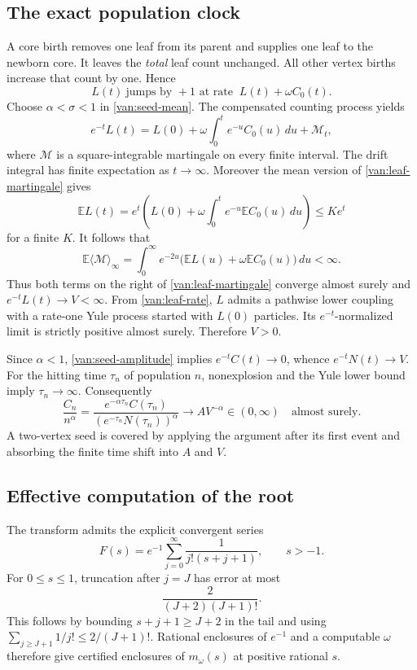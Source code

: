 \subsection{The exact population clock}

A core birth removes one leaf from its parent and supplies one leaf
to the newborn core.  It leaves the \emph{total} leaf count unchanged.
All other vertex births increase that count by one.  Hence
\begin{equation}
 L(t)\ \text{jumps by }+1\text{ at rate }\ L(t)+\omega C_0(t).
 \label{van:leaf-rate}
\end{equation}
Choose $\alpha<\sigma<1$ in \eqref{van:seed-mean}.
The compensated counting process yields
\begin{equation}
 e^{-t}L(t)=L(0)+\omega\int_0^t e^{-u}C_0(u)\,du+\mathcal M_t,
 \label{van:leaf-martingale}
\end{equation}
where $\mathcal M$ is a square-integrable martingale on every finite
interval.  The drift integral has finite expectation as $t\to\infty$.
Moreover the mean version of \eqref{van:leaf-martingale} gives
\[
 \mathbb E L(t)
 =e^t\left(L(0)+\omega\int_0^t e^{-u}\mathbb E C_0(u)\,du\right)
 \le K e^t
\]
for a finite $K$.  It follows that
\[
 \mathbb E\langle\mathcal M\rangle_\infty
 =\int_0^\infty e^{-2u}
       \bigl(\mathbb E L(u)+\omega\mathbb E C_0(u)\bigr)\,du<\infty.
\]
Thus both terms on the right of \eqref{van:leaf-martingale} converge
almost surely and $e^{-t}L(t)\to V<\infty$.
From \eqref{van:leaf-rate}, $L$ admits a pathwise lower coupling
with a rate-one Yule process started with $L(0)$ particles.
Its $e^{-t}$-normalized limit is strictly positive almost surely.
Therefore $V>0$.

Since $\alpha<1$, \eqref{van:seed-amplitude} implies
$e^{-t}C(t)\to0$, whence $e^{-t}N(t)\to V$.
For the hitting time $\tau_n$ of population $n$, nonexplosion and
the Yule lower bound imply $\tau_n\to\infty$.
Consequently
\[
 \frac{C_n}{n^\alpha}
 =\frac{e^{-\alpha\tau_n}C(\tau_n)}
        {(e^{-\tau_n}N(\tau_n))^\alpha}
 \longrightarrow A V^{-\alpha}\in(0,\infty)
 \quad\text{almost surely}.
\]
A two-vertex seed is covered by applying the argument after its
first event and absorbing the finite time shift into $A$ and $V$.

\subsection{Effective computation of the root}

The transform admits the explicit convergent series
\begin{equation}
 F(s)=e^{-1}\sum_{j=0}^\infty\frac1{j!(s+j+1)},
 \qquad s>-1.
 \label{van:series}
\end{equation}
For $0\le s\le1$, truncation after $j=J$ has error at most
\[
 \frac{2}{(J+2)(J+1)!}.
\]
This follows by bounding $s+j+1\ge J+2$ in the tail and using
$\sum_{j\ge J+1}1/j!\le2/(J+1)!$.
Rational enclosures of $e^{-1}$ and a computable $\omega$ therefore
give certified enclosures of $m_\omega(s)$ at positive rational $s$.

